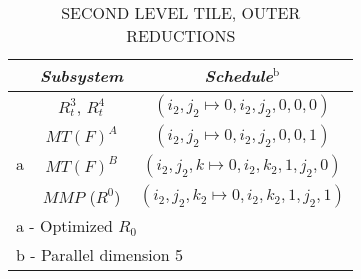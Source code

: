 \begin{table}[htbp]
\caption{\uppercase{Second Level Tile, Outer Reductions}}
\begin{center}
\begin{tabular}{|c|c|c|}
\hline
&\textbf{\textit{Subsystem}}& \textbf{\textit{Schedule}}$^{\mathrm{b}}$ \\
\hline
&$R^{3}_{t}$, $R^{4}_{t}$ & $(i_{2},j_{2} \mapsto 0, i_{2},j_{2}, 0, 0, 0)$   \\
\cline{1-3} 
 &$MT(F)^{A}$  & $(i_{2},j_{2} \mapsto 0, i_{2},j_{2}, 0, 0, 1)$   \\
\cline{2-3} 
${\mathrm{a}}$ &$MT(F)^{B}$  & $(i_{2},j_{2},k \mapsto 0, i_{2}, k_{2}, 1, j_{2}, 0)$   \\
\cline{2-3} 
&$MMP$ ($R^{0}$) & $(i_{2},j_{2},k_{2} \mapsto 0, i_{2}, k_{2}, 1, j_{2}, 1)$   \\
\hline
\multicolumn{3}{l}{${\mathrm{a}}$ - Optimized $R_{0}$}\\
\multicolumn{3}{l}{${\mathrm{b}}$ - Parallel dimension 5}
\end{tabular}
\label{tab:bpm_l2_outer_reduction_schedule}
\end{center}
\end{table}

